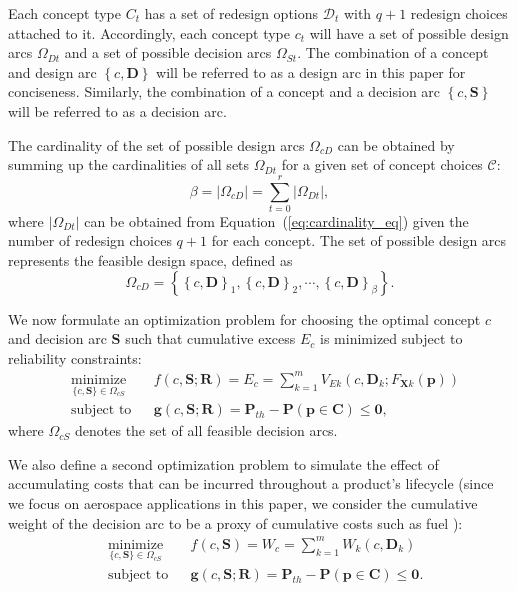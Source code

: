 Each concept type $C_t$ has a set of redesign options $\mathcal{D}_t$ with $q+1$ redesign choices attached to it. Accordingly, each concept type $c_t$ will have a set of possible design arcs $\Omega_{Dt}$ and a set of possible decision arcs $\Omega_{St}$. The combination of a concept and design arc $\left\{c,\mathbf{D}\right\}$ will be referred to as a design arc in this paper for conciseness. Similarly, the combination of a concept and a decision arc $\left\{c,\mathbf{S}\right\}$ will be referred to as a decision arc.

The cardinality of the set of possible design arcs $\Omega_{cD}$ can be obtained by summing up the cardinalities of all sets $\Omega_{Dt}$ for a given set of concept choices $\mathcal{C}$:
%
\begin{equation} \label{eq:cardinailitycdarc}
	\beta = |\Omega_{cD}| = \sum\limits_{t=0}^{r} |\Omega_{Dt}|,
\end{equation}
%
where $|\Omega_{Dt}|$ can be obtained from Equation~(\ref{eq:cardinality_eq}) given the number of redesign choices $q+1$ for each concept. The set of possible design arcs represents the feasible design space, defined as
%
\begin{equation} \label{eq:feasibledesignset}
	\Omega_{cD} = \left\{\left\{c,\mathbf{D}\right\}_1,\left\{c,\mathbf{D}\right\}_2,\cdots,\left\{c,\mathbf{D}\right\}_\beta\right\}.
\end{equation}

We now formulate an optimization problem for choosing the optimal concept $c$ and decision arc $\mathbf{S}$ such that cumulative excess $E_c$ is minimized subject to reliability constraints:
%
\begin{equation}
	\label{eq:TSEoptproblem}
	\begin{aligned}
		& \underset{\{c,\mathbf{S}\}\in\Omega_{cS}}{\text{minimize}}
		& & {f}(c,\mathbf{S};\mathbf{R}) = E_c = \sum\limits_{k=1}^{m} V_{Ek}(c,\mathbf{D}_k;F_{\mathbf{X}k}(\mathbf{p}))\\
		& \text{subject to}
		& & \mathbf{g}(c,\mathbf{S};\mathbf{R}) = \mathbf{P}_{th} - \mathbf{P}(\mathbf{p} \in \mathbf{C}) \le \mathbf{0}, 
	\end{aligned}
\end{equation}
%
where $\Omega_{cS}$ denotes the set of all feasible decision arcs.

We also define a second optimization problem to simulate the effect of accumulating costs that can be incurred throughout a product's lifecycle (since we focus on aerospace applications in this paper, we consider the cumulative weight of the decision arc to be a proxy of cumulative costs such as fuel \cite{Thomsen2016}):
\begin{equation}
	\label{eq:optproblemweight}
	\begin{aligned}
		& \underset{\{c,\mathbf{S}\}\in\Omega_{cS}}{\text{minimize}}
		& & {f}(c,\mathbf{S}) = W_c = \sum\limits_{k=1}^{m} W_{k}(c,\mathbf{D}_k)\\
		& \text{subject to}
		& & \mathbf{g}(c,\mathbf{S};\mathbf{R}) = \mathbf{P}_{th} - \mathbf{P}(\mathbf{p} \in \mathbf{C}) \le \mathbf{0}.
	\end{aligned}
\end{equation}

